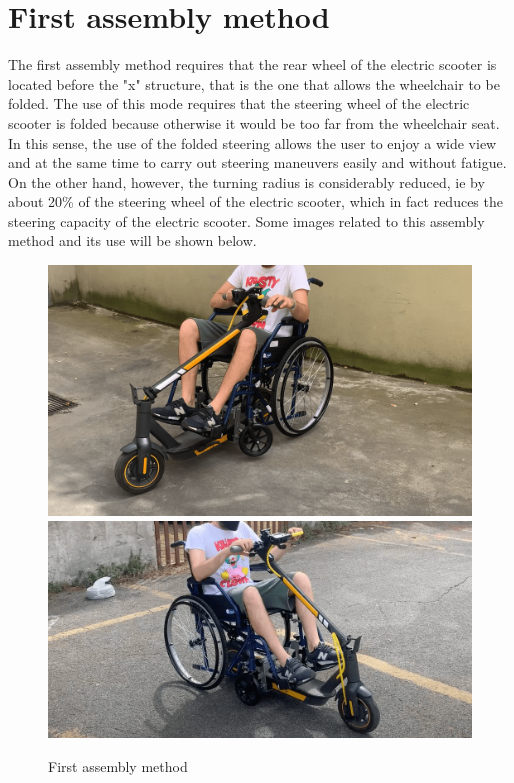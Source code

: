 \documentclass[binding=0.6cm,LaM,noexaminfo]{sapthesis}
\begin{document}
\section{First assembly method}
The first assembly method requires that the rear wheel of the electric scooter is located before the "x" structure, that is the one that allows the wheelchair to be folded. The use of this mode requires that the steering wheel of the electric scooter is folded because otherwise it would be too far from the wheelchair seat. In this sense, the use of the folded steering allows the user to enjoy a wide view and at the same time to carry out steering maneuvers easily and without fatigue. On the other hand, however, the turning radius is considerably reduced, ie by about 20\% of the steering wheel of the electric scooter, which in fact reduces the steering capacity of the electric scooter. Some images related to this assembly method and its use will be shown below.

\begin{figure}[!htp]
    \centering\includegraphics[width=.9\textwidth]{images/finished_project/IMG_2332-2.png}
    \centering\includegraphics[width=.9\textwidth]{images/finished_project/IMG_2334-2.png}
    \caption{First assembly method}
    \label{fig:first_ass}
\end{figure}
\end{document}
